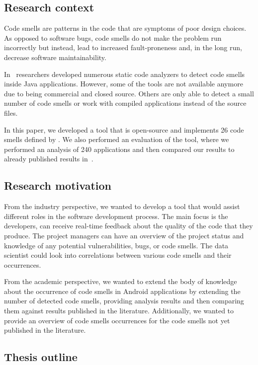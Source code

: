 \subsection{Research context}\label{subsec:research-context}

Code smells are patterns in the code that are symptoms of poor design choices.
As opposed to software bugs, code smells do not make the problem run incorrectly but
instead, lead to increased fault-proneness and, in the long run, decrease software maintainability.

In~\cite{mannan2016understanding, sonar-plugin-external, paprika-paper} researchers developed
numerous static code analyzers to detect code smells inside Java applications.
However, some of the tools are not available anymore due to being commercial and closed source.
Others are only able to detect a small number of code smells or work with compiled applications instead
of the source files.

In this paper, we developed a tool that is open-source and implements 26 code smells defined by \citeauthor{refactoring-fowler}.
We also performed an evaluation of the tool, where we performed an analysis of 240 applications and then
compared our results to already published results in~\cite{mannan2016understanding}.

\subsection{Research motivation}\label{subsec:research-motivation}

From the industry perspective, we wanted to develop a tool that would assist different roles in the software development process.
The main focus is the developers, can receive real-time feedback about the quality of the code that they produce.
The project managers can have an overview of the project status and knowledge of any potential vulnerabilities, bugs, or code smells.
The data scientist could look into correlations between various code smells and their occurrences.

From the academic perspective, we wanted to extend the body of knowledge about the occurrence of code smells in Android
applications by extending the number of detected code smells, providing analysis results and then comparing them against
results published in the literature.
Additionally, we wanted to provide an overview of code smells occurrences for the code smells not yet published in the
literature.

\subsection{Thesis outline}\label{subsec:thesis-outline}

